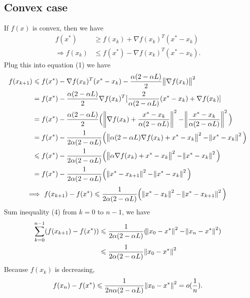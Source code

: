 \documentclass[11pt]{article}
\begin{document}
\subsection{Convex case}
If $f(x)$ is convex, then we have 
\begin{equation}\begin{split}
f(x^*)&\geqslant f(x_k)+\nabla f(x_k)^T(x^*-x_k) \\ 
\Rightarrow f(x_k) &\leqslant f(x^*) - \nabla f(x_k)^T (x^* - x_k).
\end{split}\nonumber\end{equation} 
Plug this into equation (1) we have 
\begin{equation}\begin{split} 
f(x_{k+1}) &\leqslant f(x^*) - \nabla f(x_k)^T(x^*-x_k) - \frac{\alpha(2-\alpha L)}2\norm{\nabla f(x_k)}^2 \\
&=f(x^*) - \frac{\alpha(2-\alpha L)}2\nabla f(x_k)^T[\frac2{\alpha(2-\alpha L)}(x^*-x_k)+\nabla f(x_k)] \\
&=f(x^*) - \frac{\alpha(2-\alpha L)}2\Big(\norm{\nabla f(x_k) +\frac{x^*-x_k}{\alpha(2-\alpha L)}}^2 - \norm{\frac{x^*-x_k}{\alpha(2-\alpha L)}}^2\Big) \\
&=f(x^*) - \frac1{2\alpha(2-\alpha L)}\Big( \norm{\alpha(2-\alpha L)\nabla f(x_k) + x^* - x_k}^2 - \norm{x^* - x_k}^2  \Big) \\
&\leqslant f(x^*) - \frac1{2\alpha(2-\alpha L)}\Big(\norm{\alpha\nabla f(x_k) + x^* - x_k}^2 - \norm{x^* - x_k}^2 \Big)\\
&= f(x^*) - \frac1{2\alpha(2-\alpha L)}\Big( \norm{x^*-x_{k+1}}^2 - \norm{x^* - x_k}^2  \Big)\\
\end{split}\nonumber\end{equation} 
\begin{equation}\begin{split} 
\Longrightarrow\,\, f(x_{k+1}) - f(x^*) \leqslant  \frac1{2\alpha(2-\alpha L)}\Big( \norm{x^*-x_k}^2 - \norm{x^* - x_{k+1}}^2  \Big)
\end{split}\end{equation} 
Sum inequality (4) from $k=0$ to $n-1$, we have
\begin{equation}\begin{split}
\sum_{k=0}^{n-1}(f(x_{k+1}) - f(x^*)) &\leqslant  \frac1{2\alpha(2-\alpha L)}(\norm{x_0-x^*}^2 - \norm{x_n-x^*}^2) \\
&\leqslant  \frac1{2\alpha(2-\alpha L)} \norm{x_0 - x^*}^2
\end{split}\end{equation}
Because $f(x_k)$ is decreasing, 
$$f(x_{n}) - f(x^*)\leqslant \frac1{2n\alpha(2-\alpha L)}\norm{x_0 - x^*}^2 = o(\frac1n).$$
\end{document}
